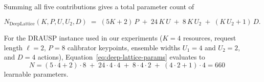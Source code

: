 Summing all five contributions gives a total parameter count of

\begin{equation}
  \label{eq:deep-lattice-params}
  N_{\text{DeepLattice}}(K,P,U,U_2,D) \;=\; (5K+2)\,P \;+\; 24\,K\,U \;+\; 8\,K\,U_2 \;+\; (K\,U_2+1)\,D.
\end{equation}

For the DRAUSP instance used in our experiments ($K=4$ resources, request length $\ell=2$, $P=8$ calibrator keypoints,
ensemble widths $U_1=4$ and $U_2=2$, and $D=4$ actions), Equation~\eqref{eq:deep-lattice-params}
evaluates to
\[
  N = (5\cdot4+2)\cdot8 \;+\; 24\cdot4\cdot4 \;+\; 8\cdot4\cdot2 \;+\; (4\cdot2+1)\cdot4 = 660
\]
learnable parameters.


